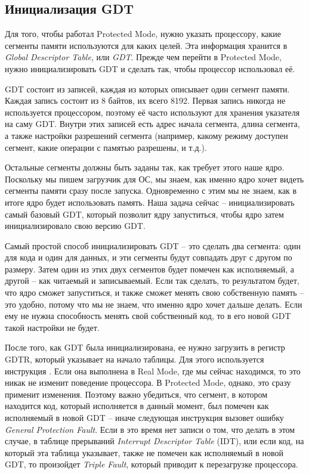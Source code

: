 \documentclass[a4page]{article}
\begin{document}
\subsection{Инициализация GDT}

Для того, чтобы работал Protected Mode, нужно указать процессору, какие сегменты памяти используются для каких целей.
Эта информация хранится в \emph{Global Descriptor Table}, или \emph{GDT}.
Прежде чем перейти в Protected Mode, нужно инициализировать GDT и сделать так, чтобы процессор использовал её.

GDT состоит из записей, каждая из которых описывает один сегмент памяти.
Каждая запись состоит из 8 байтов, их всего 8192.
Первая запись никогда не используется процессором, поэтому её часто используют для хранения указателя на саму GDT.
Внутри этих записей есть адрес начала сегмента, длина сегмента, а также настройки разрешений сегмента 
(например, какому режиму доступен сегмент, какие операции с памятью разрешены, и т.д.).


Остальные сегменты должны быть заданы так, как требует этого наше ядро.
Поскольку мы пишем загрузчик для ОС, мы знаем, как именно ядро хочет видеть сегменты памяти сразу после запуска.
Одновременно с этим мы не знаем, как в итоге ядро будет использовать память.
Наша задача сейчас -- инициализировать самый базовый GDT, который позволит ядру запуститься,
чтобы ядро затем инициализировало свою версию GDT.

Самый простой способ инициализировать GDT -- это сделать два сегмента: один для кода и один для данных,
и эти сегменты будут совпадать друг с другом по размеру.
Затем один из этих двух сегментов будет помечен как исполняемый, а другой -- как читаемый и записываемый.
Если так сделать, то результатом будет, что ядро сможет запуститься, и также сможет менять свою собственную память --
это удобно, потому что мы не знаем, что именно ядро хочет дальше делать.
Если ему не нужна способность менять свой собственный код, то в его новой GDT такой настройки не будет.

После того, как GDT была инициализирована, ее нужно загрузить в регистр GDTR, который указывает на начало таблицы.
Для этого используется инструкция .
Если она выполнена в Real Mode, где мы сейчас находимся, то это никак не изменит поведение процессора.
В Protected Mode, однако, это сразу применит изменения.
Поэтому важно убедиться, что сегмент, в котором находится код, который исполняется в данный момент,
был помечен как исполняемый в новой GDT -- иначе следующая инструкция вызовет ошибку \emph{General Protection Fault}.
Если в это время нет записи о том, что делать в этом случае, в таблице прерываний \emph{Interrupt Descriptor Table} (IDT),
или если код, на который эта таблица указывает, также не помечен как исполняемый в новой GDT,
то произойдет \emph{Triple Fault}, который приводит к перезагрузке процессора.
\end{document}
